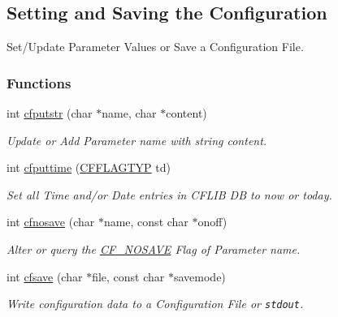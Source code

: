 \hypertarget{group__setting__saving}{
\subsection{Setting and Saving the Configuration}
\label{group__setting__saving}
}
Set/Update Parameter Values or Save a Configuration File.  


\subsubsection*{Functions}
\begin{CompactItemize}
\item 
int \hyperlink{group__setting__saving_g9553f7a24b080660793a560c2bc8f210}{cfputstr} (char $\ast$name, char $\ast$content)
\begin{CompactList}\small\item\em Update or Add Parameter {\em name\/} with string {\em content\/}. \item\end{CompactList}\item 
int \hyperlink{group__setting__saving_g6f133f88dc253a6a80d13eed4d123063}{cfputtime} (\hyperlink{group__special__options__mask_g4854f1596d5c6e0604a478fa9a2e23f0}{CFFLAGTYP} td)
\begin{CompactList}\small\item\em Set all Time and/or Date entries in CFLIB DB to {\em now\/} or {\em today\/}. \item\end{CompactList}\item 
int \hyperlink{group__setting__saving_g0f6ed90e3ecfa0074af1635a0e4339ef}{cfnosave} (char $\ast$name, const char $\ast$onoff)
\begin{CompactList}\small\item\em Alter or query the \hyperlink{group__special__options__mask_gd76153c65f68cc0ee5c1a04c8c3e80bf}{CF\_\-NOSAVE} Flag of Parameter {\em name\/}. \item\end{CompactList}\item 
int \hyperlink{group__setting__saving_g046d8a68eae35b987eacca04a9a06cca}{cfsave} (char $\ast$file, const char $\ast$savemode)
\begin{CompactList}\small\item\em Write configuration data to a Configuration File or {\tt stdout}. \item\end{CompactList}\end{CompactItemize}


